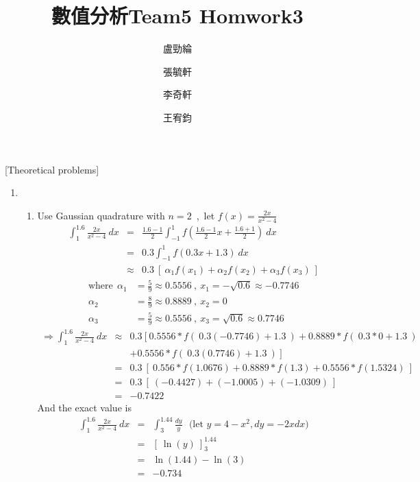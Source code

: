 \documentclass[12pt]{article}
\title{數值分析Team5 Homwork3}
\author{盧勁綸\and 張毓軒\and 李奇軒\and 王宥鈞}
\date{}
\begin{document}
\maketitle

[Theoretical problems]
\begin{enumerate}
    \item
        \begin{enumerate}
            \item %
            Use Gaussian quadrature with $n = 2$~,~let $f(x) = \frac{2x}{x^2-4}$
            \begin{eqnarray*}
                \int_{1}^{1.6} \frac{2x}{x^2-4}~dx &=& \frac{1.6-1}{2}\int_{-1}^{1}f\left(\frac{1.6-1}{2}x+\frac{1.6+1}{2}\right)~dx \\
                &=& 0.3\int_{-1}^{1}f(0.3x+1.3)~dx\\
                & \approx & 0.3~[~\alpha_1 f(x_1)+\alpha_2 f(x_2)+\alpha_3 f(x_3)~]               
            \end{eqnarray*} 
            \begin{align*}
            \text{where}~~\alpha_1 & = \frac{5}{9}\approx 0.5556~,~x_1=-\sqrt{0.6}\approx-0.7746\\
            \alpha_2&=\frac{8}{9}\approx0.8889~,~x_2=0\\
            \alpha_3&=\frac{5}{9}\approx0.5556~,~x_3=\sqrt{0.6}\approx0.7746     
            \end{align*}
            \begin{eqnarray*}
            \Rightarrow \int_{1}^{1.6}\frac{2x}{x^2-4}~dx &\approx& 0.3~[~0.5556*f(~0.3(-0.7746)+1.3~)+0.8889*f(~0.3*0+1.3~)\\
            &&+0.5556*f(~0.3(0.7746)+1.3~)~]\\
            &=&0.3~[~0.556*f(1.0676)+0.8889*f(1.3)+0.5556*f(1.5324)~]\\
            &=&0.3~[~(-0.4427)+(-1.0005)+(-1.0309)~]\\
            &=&-0.7422
            \end{eqnarray*}
            And the exact value is
            \begin{eqnarray*}
            \int_{1}^{1.6}\frac{2x}{x^2-4}~dx&=&\int_{3}^{1.44}\frac{dy}{y}
            ~~~\text{(let $y=4-x^2 , dy=-2xdx$)}\\
            &=&[~\ln(y)~]_{3}^{1.44}\\
            &=&\ln(1.44)-\ln(3)\\
            &=&-0.734
            \end{eqnarray*}
     

\end{enumerate}
\end{enumerate}
\end{document}
